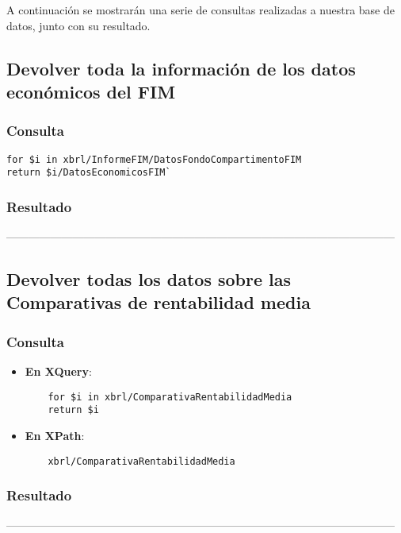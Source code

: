 \documentclass[11pt]{diazessay} %
\begin{document}
A continuación se mostrarán una serie de consultas realizadas a nuestra base de datos, junto con su resultado.

\subsection*{Devolver toda la información de los datos económicos del FIM}
\subsubsection*{Consulta}
	\lstset{language=C}
\begin{lstlisting}
for $i in xbrl/InformeFIM/DatosFondoCompartimentoFIM
return $i/DatosEconomicosFIM`
\end{lstlisting}
	
\subsubsection*{Resultado}
 
---------------------------------------------------------------------------------------------------------\\


\subsection*{Devolver todas los datos sobre las Comparativas de rentabilidad media}
\subsubsection*{Consulta}
\begin{itemize}
	\item \textbf{En XQuery}:
	\lstset{language=C}
	\begin{lstlisting}
	for $i in xbrl/ComparativaRentabilidadMedia
	return $i
	\end{lstlisting}
	
	\item \textbf{En XPath}:
	\lstset{language=C}
	\begin{lstlisting}
	xbrl/ComparativaRentabilidadMedia
	\end{lstlisting}
\end{itemize}

\subsubsection*{Resultado}
 
---------------------------------------------------------------------------------------------------------\\
\end{document}
